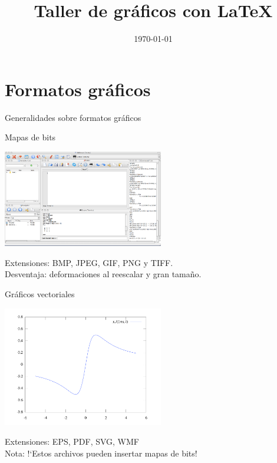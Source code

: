 \documentclass{beamer}
\title[Taller de \LaTeX]{Taller de gr\'aficos con \LaTeX}
\institute[UGR]{Universidad de Granada}
\date{\today}
\begin{document}
\maketitle

\section{Formatos gr\'aficos}
\begin{frame}{Generalidades sobre formatos gr\'aficos}
\begin{block}{Mapas de bits} 
\begin{center}
\includegraphics[width=7cm]{./graficos/QtOctave.pdf}
\end{center}
Extensiones: BMP, JPEG, GIF, PNG y TIFF. \\
{\small Desventaja: deformaciones al reescalar y gran tama\~no.}
\end{block}
\end{frame}
\begin{frame}
\begin{block} {Gr\'aficos vectoriales} 
\begin{center}
\includegraphics[width=7cm]{graficos/fplot.pdf}
\end{center}
Extensiones: EPS, PDF, SVG, WMF \\
{\small Nota: !`Estos archivos pueden insertar mapas de bits! }
\end{block}
\end{frame}

\end{document}

